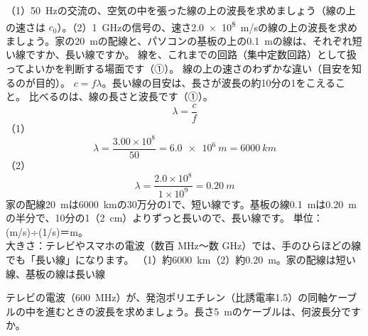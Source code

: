 \label{ph:電-13:ex6}
\begin{phreidai}
（1）\qty{50}{Hz}の交流の、空気の中を張った線の上の波長を求めましょう（線の上の速さは $c_0$）。（2）\qty{1}{GHz}の信号の、速さ\qty{2.0e8}{m/s}の線の上の波長を求めましょう。家の\qty{20}{m}の配線と、パソコンの基板の上の\qty{0.1}{m}の線は、それぞれ短い線ですか、長い線ですか。
\phbamen
線を、これまでの回路（集中定数回路）として扱ってよいかを判断する場面です（①）。
\phmushi
線の上の速さのわずかな違い（目安を知るのが目的）。
\phzu
$c=f\lambda$。長い線の目安は、長さが波長の約10分の1をこえること。
\phriyu
比べるのは、線の長さと波長です（①）。
\phtateru
\[\lambda=\frac{c}{f}\]
\phtoku
（1）\[\lambda=\frac{3.00\times10^8}{50}=\qty{6.0e6}{m}=\qty{6000}{km}\]
（2）\[\lambda=\frac{2.0\times10^8}{1\times10^9}=\qty{0.20}{m}\]
家の配線\qty{20}{m}は\qty{6000}{km}の30万分の1で、短い線です。基板の線\qty{0.1}{m}は\qty{0.20}{m}の半分で、10分の1（\qty{2}{cm}）よりずっと長いので、長い線です。
\phtashikame
単位：(m/s)÷(1/s)＝m。\\
大きさ：テレビやスマホの電波（数百 MHz〜数 GHz）では、手のひらほどの線でも「長い線」になります。
\kotae （1）約\qty{6000}{km}（2）約\qty{0.20}{m}。家の配線は短い線、基板の線は長い線
\end{phreidai}
\begin{jibun}
テレビの電波（\qty{600}{MHz}）が、発泡ポリエチレン（比誘電率1.5）の同軸ケーブルの中を進むときの波長を求めましょう。長さ\qty{5}{m}のケーブルは、何波長分ですか。
\end{jibun}

